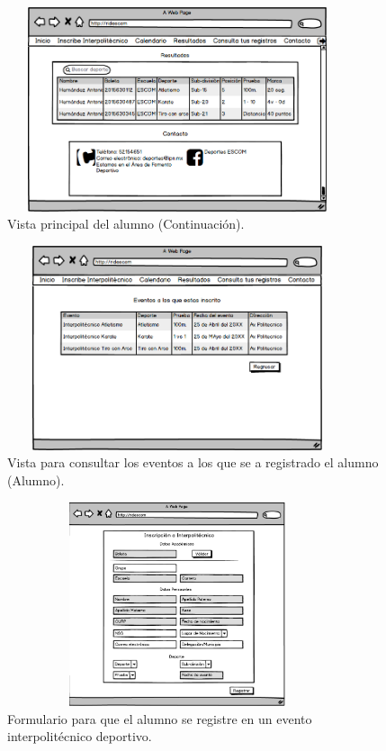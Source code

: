 		\begin{figure} [hbt!]
			\centering
			\includegraphics[width=10cm, height=6cm]{Imagenes/Nuevos/P19_Inicio_paticipante1}
			\caption{Vista principal del alumno (Continuación).}
			\label{principalalum1}
		\end{figure}
	
		\begin{figure} [hbt!]
			\centering
			\includegraphics[width=10cm, height=6cm]{Imagenes/Nuevos/P20_Consulta_Inscripciones}
			\caption{Vista para consultar los eventos a los que se a registrado el alumno (Alumno).}
			\label{consultainscripcion}
		\end{figure}
	\pagebreak
		
		\begin{figure} [hbt!]
			\centering
			\includegraphics[width=10cm, height=6cm]{Imagenes/Disenos/Inscripcioninter}
			\caption{Formulario para que el alumno se registre en un evento interpolitécnico deportivo.}
			\label{Inscripcioninterpolitecnico}
		\end{figure}
		

